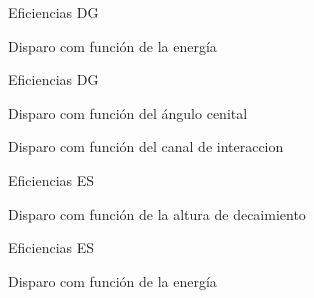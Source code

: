 \begin{frame}{Eficiencias DG}
	\begin{block}{Disparo com funci\'on de la energ\'ia}
		\begin{center}
		\end{center}
	\end{block}
\end{frame}

\begin{frame}{Eficiencias DG}
\footnotesize
	\begin{block}{Disparo com funci\'on del \'angulo cenital}
		\begin{center}
		\hspace{3mm}
		\end{center}
	\end{block}
% 
	\begin{block}{Disparo com funci\'on del canal de interaccion}
		\begin{center}
		\hspace{3mm}
		\end{center}
	\end{block}
\end{frame}

\begin{frame}{Eficiencias ES}
	\begin{block}{Disparo com funci\'on de la altura de decaimiento}
		\begin{center}
		\end{center}
	\end{block}
\end{frame}

\begin{frame}{Eficiencias ES}
	\begin{block}{Disparo com funci\'on de la energ\'ia}
		\begin{center}
		\end{center}
	\end{block}
\end{frame}

